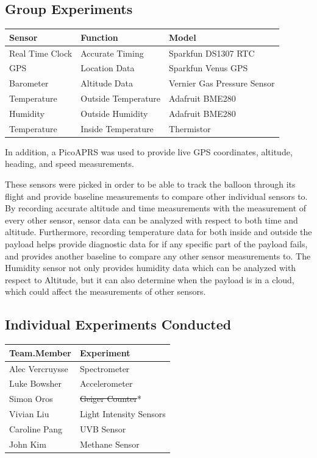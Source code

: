 \documentclass[12pt,]{article}
\begin{document}
\subsection{Group Experiments}\label{group-experiments}

\begin{longtable}[]{@{}lll@{}}
\toprule
Sensor & Function & Model\tabularnewline
\midrule
\endhead
Real Time Clock & Accurate Timing & Sparkfun DS1307 RTC\tabularnewline
GPS & Location Data & Sparkfun Venus GPS\tabularnewline
Barometer & Altitude Data & Vernier Gas Pressure Sensor\tabularnewline
Temperature & Outside Temperature & Adafruit BME280\tabularnewline
Humidity & Outside Humidity & Adafruit BME280\tabularnewline
Temperature & Inside Temperature & Thermistor\tabularnewline
\bottomrule
\end{longtable}

In addition, a PicoAPRS was used to provide live GPS coordinates,
altitude, heading, and speed measurements.

These sensors were picked in order to be able to track the balloon
through its flight and provide baseline measurements to compare other
individual sensors to. By recording accurate altitude and time
measurements with the measurement of every other sensor, sensor data can
be analyzed with respect to both time and altitude. Furthermore,
recording temperature data for both inside and outside the payload helps
provide diagnostic data for if any specific part of the payload fails,
and provides another baseline to compare any other sensor measurements
to. The Humidity sensor not only provides humidity data which can be
analyzed with respect to Altitude, but it can also determine when the
payload is in a cloud, which could affect the measurements of other
sensors.

\subsection{Individual Experiments
Conducted}\label{individual-experiments-conducted}

\begin{longtable}[]{@{}ll@{}}
\toprule
Team.Member & Experiment\tabularnewline
\midrule
\endhead
Alec Vercruysse & Spectrometer\tabularnewline
Luke Bowsher & Accelerometer\tabularnewline
Simon Oros & \sout{Geiger Counter}*\tabularnewline
Vivian Liu & Light Intensity Sensors\tabularnewline
Caroline Pang & UVB Sensor\tabularnewline
John Kim & Methane Sensor\tabularnewline
\bottomrule
\end{longtable}
\end{document}
